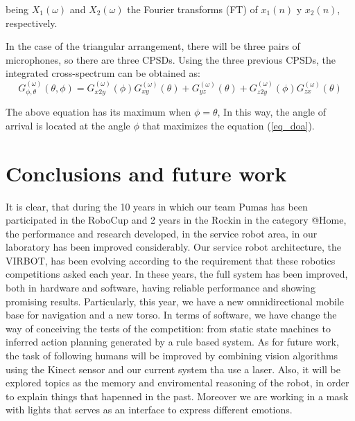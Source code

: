 \documentclass{llncs}
\begin{document}
being $X_1(\omega)$ and $X_2(\omega)$ the Fourier transforms (FT) of $x_1(n)$ y $x_2(n)$, respectively.%
%

In the case of the triangular arrangement, there will be three pairs of microphones, so there are three CPSDs. Using the three previous CPSDs, the integrated cross-spectrum can be obtained as:
\begin{equation} \label{eq_doa}
	G_{\phi,\theta}^{(\omega)} (\theta,\phi) = G_{x2y}^{(\omega)}(\phi)G_{xy}^{(\omega)}(\theta)+G_{yz}^{(\omega)}(\theta)+G_{z2y}^{(\omega)}(\phi)G_{zx}^{(\omega)}(\theta)
\end{equation}


The above equation has its maximum when $\phi=\theta$, In this way, the angle of arrival is located at the angle $\phi$ that maximizes the equation (\ref{eq_doa}).


\section{Conclusions and future work}\label{sec:conclusions}
It is clear, that during the 10 years in which our team Pumas has been participated in the RoboCup and 2 years in the Rockin \cite{Robocup_2017} in the category @Home, the performance and research developed, in the service robot area, in our laboratory has been improved considerably.
Our service robot architecture, the VIRBOT, has been evolving according to the requirement that these robotics competitions asked each year.
In these years, the full system has been improved, both in hardware and software, having reliable performance and showing promising results. Particularly, this year, we have a new omnidirectional mobile base for navigation and a new torso. 
In terms of software, we have change the way of conceiving the tests of the competition: from static state machines to inferred action planning generated by a rule based system. 
As for future work, the task of following humans will be improved by combining vision algorithms using the Kinect sensor and our current system tha use a laser. Also, it will be explored topics as the memory and enviromental reasoning of the robot, in order to explain things that hapenned in the past. Moreover we are working in a mask with lights that serves as an interface to express different emotions.


\end{document}
